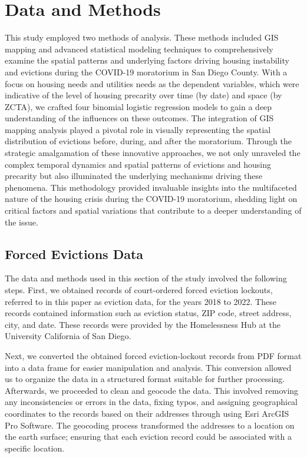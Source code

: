 \documentclass[man, 12pt, donotrepeattitle, floatsintext]{apa7} %
\begin{document}
\section{Data and Methods}

This study employed two methods of analysis. These methods included GIS mapping and advanced statistical modeling techniques to comprehensively examine the spatial patterns and underlying factors driving housing instability and evictions during the COVID-19 moratorium in San Diego County. With a focus on housing needs and utilities needs as the dependent variables, which were indicative of the level of housing precarity over time (by date) and space (by ZCTA), we crafted four binomial logistic regression models to gain a deep understanding of the influences on these outcomes. The integration of GIS mapping analysis played a pivotal role in visually representing the spatial distribution of evictions before, during, and after the moratorium. Through the strategic amalgamation of these innovative approaches, we not only unraveled the complex temporal dynamics and spatial patterns of evictions and housing precarity but also illuminated the underlying mechanisms driving these phenomena. This methodology provided invaluable insights into the multifaceted nature of the housing crisis during the COVID-19 moratorium, shedding light on critical factors and spatial variations that contribute to a deeper understanding of the issue.

\subsection{Forced Evictions Data}
The data and methods used in this section of the study involved the following steps. First, we obtained records of court-ordered forced eviction lockouts, referred to in this paper as eviction data, for the years 2018 to 2022. These records contained information such as eviction status, ZIP code, street address, city, and date. These records were provided by the Homelessness Hub at the University California of San Diego. 

Next, we converted the obtained forced eviction-lockout records from PDF format into a  data frame for easier manipulation and analysis. This conversion allowed us to organize the data in a structured format suitable for further processing. Afterwards, we proceeded to clean and geocode the data. This involved removing any inconsistencies or errors in the data, fixing typos, and assigning geographical coordinates to the records based on their addresses through using Esri ArcGIS Pro Software. The geocoding process transformed the addresses to a location on the earth surface; ensuring that each eviction record could be associated with a specific location.
\end{document}
